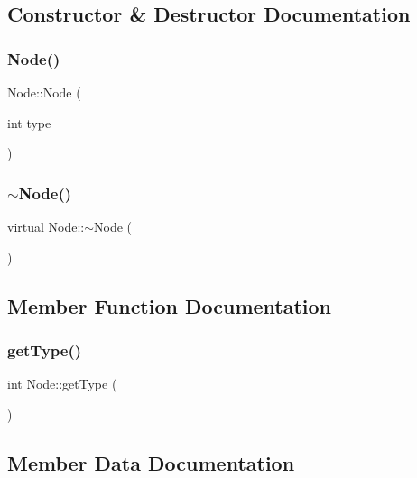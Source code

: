 \subsection{Constructor \& Destructor Documentation}
\mbox{\label{classNode_a81891cf87be70506850d76a39dad29dd}} 
\subsubsection{\texorpdfstring{Node()}{Node()}}
{\footnotesize\ttfamily Node\+::\+Node (\begin{DoxyParamCaption}\item[{int}]{type }\end{DoxyParamCaption})}

\mbox{\label{classNode_af5e3fa79300bf5f3f2f3ecae6e795a94}} 
\subsubsection{\texorpdfstring{$\sim$\+Node()}{~Node()}}
{\footnotesize\ttfamily virtual Node\+::$\sim$\+Node (\begin{DoxyParamCaption}{ }\end{DoxyParamCaption})\hspace{0.3cm}{\ttfamily [virtual]}}



\subsection{Member Function Documentation}
\mbox{\label{classNode_a8de16678e4b507d5caee3fe52bfa053b}} 
\subsubsection{\texorpdfstring{get\+Type()}{getType()}}
{\footnotesize\ttfamily int Node\+::get\+Type (\begin{DoxyParamCaption}{ }\end{DoxyParamCaption})}



\subsection{Member Data Documentation}
\mbox{\label{classNode_a2559a716f69ccaa76d648d9f1b83065e}} 

